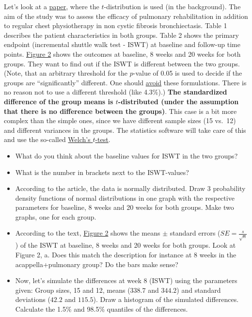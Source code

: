 \documentclass[
]{book}
\providecommand{\tightlist}{%
  \setlength{\itemsep}{0pt}\setlength{\parskip}{0pt}}
\begin{document}
Let's look at a \href{https://www.sciencedirect.com/science/article/pii/S0954611112002958\#aep-abstract-id3}{paper},
where the \(t\)-distribution is used (in the background). The aim of the study was to assess the efficacy of pulmonary
rehabilitation in addition to regular chest physiotherapy in non cystic fibrosis bronchiectasis.
Table 1 describes the patient characteristics in both groups.
Table 2 shows the primary endpoint (incremental shuttle walk test - ISWT) at baseline and follow-up time points.
\href{https://ars.els-cdn.com/content/image/1-s2.0-S0954611112002958-gr2_lrg.jpg}{Figure 2} shows the outcomes
at baseline, 8 weeks and 20 weeks for both groups.
They want to find out if the ISWT is different between the two groups.
(Note, that an arbitrary threshold for the \(p\)-value of 0.05 is used to decide if the groups
are ``significantly'' different. One should \href{https://www.tandfonline.com/doi/full/10.1080/00031305.2019.1583913}{avoid} these formulations.
There is no reason not to use a different threshold (like 4.3\%).)
\textbf{The standardized difference of the group means is \(t\)-distributed (under the assumption that there is no difference between the groups)}. This case is a bit more complex than the simple ones,
since we have different sample sizes (15 vs.~12) and different variances in the groups. The statistics software will take care of this
and use the so-called \href{https://en.wikipedia.org/wiki/Welch\%27s_t-test}{Welch's \(t\)-test}.

\begin{itemize}
\tightlist
\item
  What do you think about the baseline values for ISWT in the two groups?
\item
  What is the number in brackets next to the ISWT-values?
\item
  According to the article, the data is normally distributed.
  Draw 3 probability density functions of normal distributions in one graph with the respective parameters
  for baseline, 8 weeks and 20 weeks for both groups. Make two graphs, one for each group.
\item
  According to the text, \href{https://ars.els-cdn.com/content/image/1-s2.0-S0954611112002958-gr2_lrg.jpg}{Figure 2} shows the means
  \(\pm\) standard errors (\(SE = \frac{s}{\sqrt{n}}\)) of the ISWT at baseline, 8 weeks and 20 weeks for both groups. Look at Figure 2, a.
  Does this match the description for instance at 8 weeks in the acappella+pulmonary group?
  Do the bars make sense?
\item
  Now, let's simulate the differences at week 8 (ISWT) using the parameters given: Group sizes, 15 and 12,
  means (\(338.7\) and \(344.2\)) and standard deviations (\(42.2\) and \(115.5\)).
  Draw a histogram of the simulated differences.
  Calculate the 1.5\% and 98.5\% quantiles of the differences.
\end{itemize}
\end{document}
